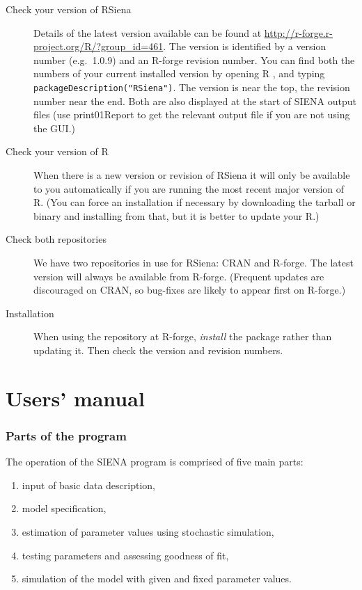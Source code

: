 \documentclass[a4paper,fleqn,11pt]{article}
\newcommand{\+}{\, + \,}
\newcommand{\sfn}[1]{\textsf{#1}}
\newcommand{\R}{{\sf R }}
\newcommand{\Rn}{{\sf R}}
\newcommand{\rs}{{\sf RSiena}}
\newcommand{\RS}{{\sf RSiena }}
\newcommand{\SI}{{\sf SIENA }}
\begin{document}
{\begin{description}
\item[Check your version of \RS] Details of the latest version available can
  be found at \url{http://r-forge.r-project.org/R/?group_id=461}. The version is
  identified by a version number (e.g.\ 1.0.9) and an R-forge revision
  number. You can find both the numbers of your current installed version by
  opening \R, and typing \\
  \verb|packageDescription("RSiena")|. The version is
  near the top, the revision number near the end. Both are also displayed at the
  start of \SI output files (use \sfn{print01Report} to get the relevant output
  file if you are not using the GUI.)
\item[Check your version of \Rn] When there is a new version or revision of \RS
  it will only be available to you automatically if you are running the most
  recent major version of \Rn. (You can force an installation if
  necessary by downloading the tarball or binary and installing from that, but
  it is better to update your \Rn.)
\item [Check both repositories] We have two repositories in use for \rs: CRAN
  and R-forge. The latest version will always be available from
  R-forge. (Frequent updates are discouraged on CRAN, so bug-fixes are likely to
  appear first on R-forge.)
\item[Installation] When using the repository at R-forge, \emph{install} the
  package rather than updating it. Then check the version and revision numbers.
\end{description}


\newpage


\part{Users' manual}

\section[Program parts]{Parts of the program}
\label{S_parts}

The operation of the \SI program is comprised of five main parts:
\begin{enumerate}
 \item input of basic data description,
 \item model specification,
 \item estimation of parameter values using stochastic simulation,
 \item testing parameters and assessing goodness of fit,
 \item simulation of the model with given and fixed parameter values.
\end{enumerate}

}
\end{document}

